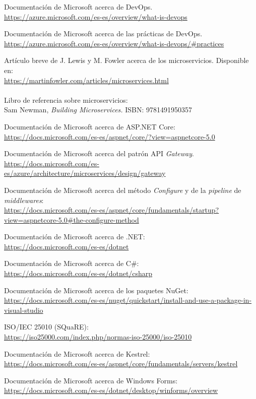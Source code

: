 \documentclass[11pt,spanish,listoffigures]{tfgetsinf}
\begin{document}
\begin{thebibliography}{10}

Documentación de Microsoft acerca de DevOps.\\
\url{https://azure.microsoft.com/es-es/overview/what-is-devops}

Documentación de Microsoft acerca de las prácticas de DevOps.\\
\url{https://azure.microsoft.com/es-es/overview/what-is-devops/#practices}

Artículo breve de J. Lewis y M. Fowler acerca de los microservicios.
\newblock Disponible en:\\
\url{https://martinfowler.com/articles/microservices.html}\\\\
\newblock Libro de referencia sobre microservicios:\\
\newblock Sam Newman,
\newblock \emph{Building Microservices.}
\newblock ISBN: 9781491950357

Documentación de Microsoft acerca de ASP.NET Core:\\
\url{https://docs.microsoft.com/es-es/aspnet/core/?view=aspnetcore-5.0}

Documentación de Microsoft acerca del patrón API \emph{Gateway}.\\
\url{https://docs.microsoft.com/es-es/azure/architecture/microservices/design/gateway}

Documentación de Microsoft acerca del método \emph{Configure} y de la \emph{pipeline} de \emph{middlewares}:\\
\url{https://docs.microsoft.com/es-es/aspnet/core/fundamentals/startup?view=aspnetcore-5.0#the-configure-method}

Documentación de Microsoft acerca de .NET:\\
\url{https://docs.microsoft.com/es-es/dotnet}

Documentación de Microsoft acerca de C\#:\\
\url{https://docs.microsoft.com/es-es/dotnet/csharp}

Documentación de Microsoft acerca de los paquetes NuGet:\\
\url{https://docs.microsoft.com/es-es/nuget/quickstart/install-and-use-a-package-in-visual-studio}

ISO/IEC 25010 (SQuaRE):\\
\url{https://iso25000.com/index.php/normas-iso-25000/iso-25010}

Documentación de Microsoft acerca de Kestrel:\\
\url{https://docs.microsoft.com/es-es/aspnet/core/fundamentals/servers/kestrel}

Documentación de Microsoft acerca de Windows Forms:\\
\url{https://docs.microsoft.com/es-es/dotnet/desktop/winforms/overview}

\end{thebibliography}
\end{document}
